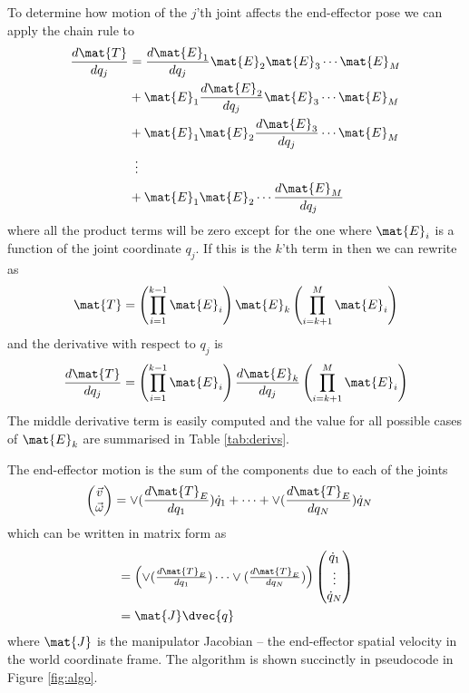 \documentclass[11pt]{article}
\begin{document}
To determine how motion of the $j$'th joint affects the end-effector pose we can apply the chain rule to 
\begin{align*}
\frac{d \mat{T}}{dq_j} &= \frac{d \mat{E}_1}{dq_j} \mat{E}_2 \mat{E}_3 \cdots \mat{E}_M \\
&+ \mat{E}_1 \frac{d \mat{E}_2}{dq_j} \mat{E}_3 \cdots \mat{E}_M \\
&+ \mat{E}_1 \mat{E}_2 \frac{d \mat{E}_3}{dq_j}  \cdots \mat{E}_M \\
& \hspace{0.5em} \vdots \\
& + \mat{E}_1 \mat{E}_2 \cdots \frac{d \mat{E}_M}{dq_j} 
\end{align*}
where all the product terms will be zero except for the one where $\mat{E}_i$ is a function of the joint coordinate $q_j$.
If this is the $k$'th term in   then we can rewrite  as
\[
 \mat{T} = \left( \prod_{i=1}^{k-1} \mat{E}_i  \right)  \mat{E}_k    \left( \prod_{i=k+1}^{M} \mat{E}_i  \right)
\]
and the derivative with respect to $q_j$ is
\begin{equation}
\frac{d \mat{T}}{dq_j} = \left( \prod_{i=1}^{k-1} \mat{E}_i  \right)  \frac{d \mat{E}_k}{dq_j}   \left( \prod_{i=k+1}^{M} \mat{E}_i  \right)\label{eq:dtdq}
\end{equation}
The middle derivative term  is easily computed and the value for all possible cases of $\mat{E}_k$ are summarised in Table \ref{tab:derivs}.

The end-effector motion is the sum of the components due to each of the joints
\begin{align}
\begin{pmatrix} \vec{v} \\ \vec{\omega} \end{pmatrix} &=
\vee( \frac{d \mat{T}_E}{d q_1}) \dot{q}_1 + \cdots + \vee( \frac{d \mat{T}_E}{d q_N}) \dot{q}_N 
\end{align}
which can be written in matrix form as
\begin{align}
&= \begin{pmatrix} \vee( \frac{d \mat{T}_E}{d q_1})  \cdots \vee( \frac{d \mat{T}_E}{d q_N})  \end{pmatrix} \begin{pmatrix}\dot{q}_1  \\ \vdots \\ \dot{q}_N \end{pmatrix} \\
&= \mat{J} \dvec{q}
\end{align}
where $\mat{J}$ is the manipulator Jacobian -- the end-effector spatial velocity in the world coordinate frame.
The algorithm is shown succinctly in pseudocode in Figure \ref{fig:algo}.
\end{document}
